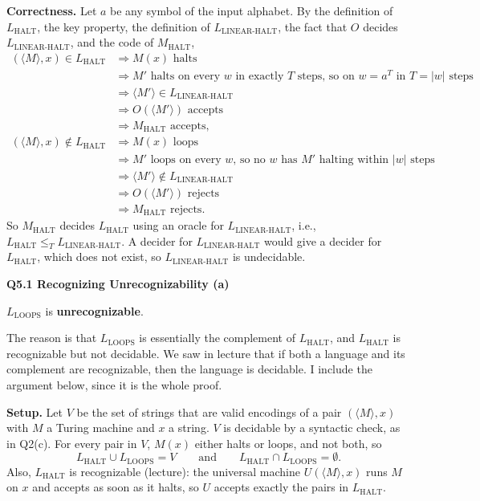 \documentclass[11pt]{article}
\newcommand{\abs}[1]{\left|#1\right|}
\newcommand{\inner}[1]{\langle #1 \rangle}
\newcommand{\lT}{\leq_T}
\newcommand{\Lh}{L_{\text{HALT}}}
\newcommand{\Llh}{L_{\text{LINEAR-HALT}}}
\newcommand{\Lloops}{L_{\text{LOOPS}}}
\newcommand{\qpage}[1]{\clearpage\noindent\textbf{\large #1}\par\medskip}
\begin{document}
\textbf{Correctness.}
Let $a$ be any symbol of the input alphabet.
By the definition of $\Lh$, the key property, the definition of $\Llh$, the fact that $O$ decides $\Llh$, and the code of $M_{\text{HALT}}$,
\begin{align*}
  (\inner{M}, x) \in \Lh &\Longrightarrow M(x) \text{ halts} \\
  &\Longrightarrow M' \text{ halts on every } w \text{ in exactly } T \text{ steps, so on } w = a^T \text{ in } T = \abs{w} \text{ steps} \\
  &\Longrightarrow \inner{M'} \in \Llh \\
  &\Longrightarrow O(\inner{M'}) \text{ accepts} \\
  &\Longrightarrow M_{\text{HALT}} \text{ accepts}, \\[0.5em]
  (\inner{M}, x) \notin \Lh &\Longrightarrow M(x) \text{ loops} \\
  &\Longrightarrow M' \text{ loops on every } w\text{, so no } w \text{ has } M' \text{ halting within } \abs{w} \text{ steps} \\
  &\Longrightarrow \inner{M'} \notin \Llh \\
  &\Longrightarrow O(\inner{M'}) \text{ rejects} \\
  &\Longrightarrow M_{\text{HALT}} \text{ rejects}.
\end{align*}
So $M_{\text{HALT}}$ decides $\Lh$ using an oracle for $\Llh$, i.e., $\Lh \lT \Llh$.
A decider for $\Llh$ would give a decider for $\Lh$, which does not exist, so $\Llh$ is undecidable.

\qpage{Q5.1 Recognizing Unrecognizability (a)}

$\Lloops$ is \textbf{unrecognizable}.

The reason is that $\Lloops$ is essentially the complement of $\Lh$, and $\Lh$ is recognizable but not decidable.
We saw in lecture that if both a language and its complement are recognizable, then the language is decidable.
I include the argument below, since it is the whole proof.

\textbf{Setup.}
Let $V$ be the set of strings that are valid encodings of a pair $(\inner{M}, x)$ with $M$ a Turing machine and $x$ a string.
$V$ is decidable by a syntactic check, as in Q2(c).
For every pair in $V$, $M(x)$ either halts or loops, and not both, so
\[
  \Lh \cup \Lloops = V \qquad\text{and}\qquad \Lh \cap \Lloops = \emptyset .
\]
Also, $\Lh$ is recognizable (lecture): the universal machine $U(\inner{M}, x)$ runs $M$ on $x$ and accepts as soon as it halts, so $U$ accepts exactly the pairs in $\Lh$.
\end{document}
